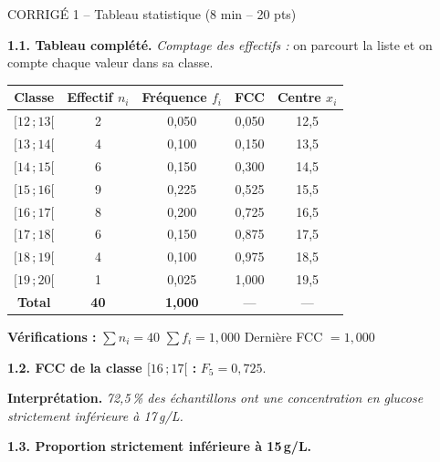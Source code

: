 \documentclass[11pt,a4paper]{article}
\begin{document}
\newpage

\begin{epreuve}{CORRIGÉ 1 -- Tableau statistique \hfill \small (8 min -- 20 pts)}

\vspace{0.2cm}
\textbf{1.1. Tableau complété.}
\emph{Comptage des effectifs :} on parcourt la liste et on compte chaque valeur dans sa classe.

\vspace{0.2cm}
\renewcommand{\arraystretch}{1.45}
\begin{center}
\small
\begin{tabular}{|c|c|c|c|c|}
\hline
\rowcolor{corrige!15}
\textbf{Classe} & \textbf{Effectif $n_i$} & \textbf{Fréquence $f_i$} & \textbf{FCC} & \textbf{Centre $x_i$} \\
\hline
$[12\,;13[$ & 2 & 0{,}050 & 0{,}050 & 12{,}5 \\
\hline
$[13\,;14[$ & 4 & 0{,}100 & 0{,}150 & 13{,}5 \\
\hline
$[14\,;15[$ & 6 & 0{,}150 & 0{,}300 & 14{,}5 \\
\hline
$[15\,;16[$ & 9 & 0{,}225 & 0{,}525 & 15{,}5 \\
\hline
$[16\,;17[$ & 8 & 0{,}200 & 0{,}725 & 16{,}5 \\
\hline
$[17\,;18[$ & 6 & 0{,}150 & 0{,}875 & 17{,}5 \\
\hline
$[18\,;19[$ & 4 & 0{,}100 & 0{,}975 & 18{,}5 \\
\hline
$[19\,;20[$ & 1 & 0{,}025 & 1{,}000 & 19{,}5 \\
\hline
\rowcolor{corrige!15}
\textbf{Total} & \textbf{40} & \textbf{1{,}000} & --- & --- \\
\hline
\end{tabular}
\end{center}

\medskip
\textbf{Vérifications :} $\sum n_i = 40$ \checkmark \quad $\sum f_i = 1{,}000$ \checkmark \quad Dernière FCC $= 1{,}000$ \checkmark

\vspace{0.3cm}
\textbf{1.2. FCC de la classe $[16\,;17[$ :} $F_5 = 0{,}725$.

\medskip
\textbf{Interprétation.} \emph{72{,}5\,\% des échantillons ont une concentration en glucose strictement inférieure à 17\,g/L.}

\vspace{0.3cm}
\textbf{1.3. Proportion strictement inférieure à 15\,g/L.}


\end{epreuve}
\end{document}
